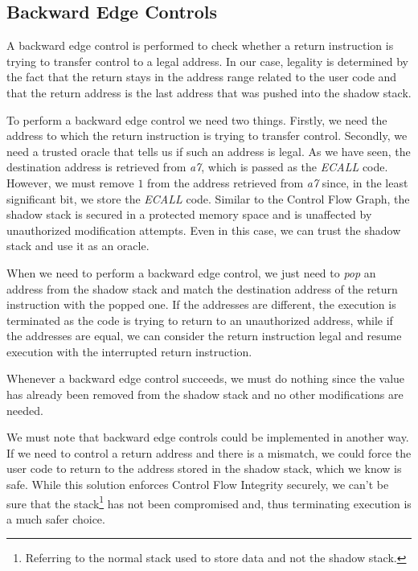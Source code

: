 \subsection{Backward Edge Controls}
\label{subsec:backward}

A backward edge control is performed to check whether a return instruction is
trying to transfer control to a legal address. In our case, legality is
determined by the fact that the return stays in the address range related to the
user code and that the return address is the last address that was pushed into
the shadow stack.

To perform a backward edge control we need two things. Firstly, we need the
address to which the return instruction is trying to transfer control. Secondly,
we need a trusted oracle that tells us if such an address is legal. As we have seen,
the destination address is retrieved from \textit{a7}, which is passed as the
\textit{ECALL} code. However, we must remove $1$ from the address retrieved from
\textit{a7} since, in the least significant bit, we store the \textit{ECALL} code.
Similar to the Control Flow Graph, the shadow stack is secured in a protected memory
space and is unaffected by unauthorized modification attempts. Even in this case,
we can trust the shadow stack and use it as an oracle.

When we need to perform a backward edge control, we just need to \textit{pop} an
address from the shadow stack and match the destination address of the return instruction
with the popped one. If the addresses are different, the execution is terminated
as the code is trying to return to an unauthorized address, while if the
addresses are equal, we can consider the return instruction legal and resume execution
with the interrupted return instruction.

Whenever a backward edge control succeeds, we must do nothing since the value
has already been removed from the shadow stack and no other modifications are
needed.

We must note that backward edge controls could be implemented in another way. If
we need to control a return address and there is a mismatch, we could force the
user code to return to the address stored in the shadow stack, which we know is safe.
While this solution enforces Control Flow Integrity securely, we can't be sure that
the stack\footnote{Referring to the normal stack used to store data and not the
shadow stack.} has not been compromised and, thus terminating execution is a much
safer choice.

